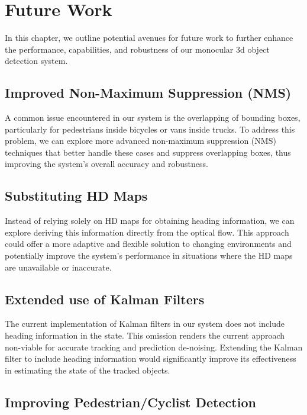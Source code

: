 
\chapter{Future Work}
\label{ch:future}

In this chapter, we outline potential avenues for future work to further enhance the performance, capabilities, and robustness of our monocular 3d object detection system.

\section{Improved Non-Maximum Suppression (NMS)}
\label{sec:nms}

A common issue encountered in our system is the overlapping of bounding boxes, particularly for pedestrians inside bicycles or vans inside trucks.
To address this problem, we can explore more advanced non-maximum suppression (NMS) techniques that better handle these cases and suppress overlapping boxes, thus improving the system's overall accuracy and robustness.

\section{Substituting HD Maps}
\label{sec:nomap}

Instead of relying solely on HD maps for obtaining heading information, we can explore deriving this information directly from the optical flow.
This approach could offer a more adaptive and flexible solution to changing environments and potentially improve the system's performance in situations where the HD maps are unavailable or inaccurate.

\section{Extended use of Kalman Filters}
\label{sec:extkalman}

The current implementation of Kalman filters in our system does not include heading information in the state.
This omission renders the current approach non-viable for accurate tracking and prediction de-noising.
Extending the Kalman filter to include heading information would significantly improve its effectiveness in estimating the state of the tracked objects.

\section{Improving Pedestrian/Cyclist Detection}
\label{sec:improvepedcyclist}

